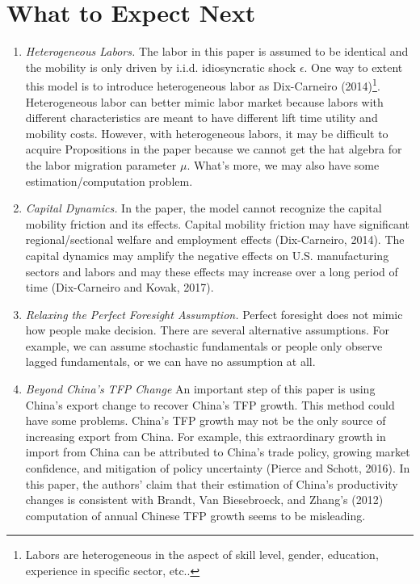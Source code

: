 \documentclass{article}
\begin{document}
\section{What to Expect Next}
\begin{enumerate}
    \item \textit{Heterogeneous Labors. } The labor in this paper is assumed to be identical and the mobility is only driven by i.i.d. idiosyncratic shock $\epsilon$. One way to extent this model is to introduce heterogeneous labor as Dix-Carneiro (2014)\footnote{Labors are heterogeneous in the aspect of skill level, gender, education, experience in specific sector, etc..}. Heterogeneous labor can better mimic labor market because labors with different characteristics are meant to have different lift time utility and mobility costs. However, with heterogeneous labors, it may be difficult to acquire Propositions in the paper because we cannot get the hat algebra for the labor migration parameter $\mu$. What's more, we may also have some estimation/computation problem.
    \item \textit{Capital Dynamics. } In the paper, the model cannot recognize the capital mobility friction and its effects. Capital mobility friction may have significant regional/sectional welfare and employment effects (Dix-Carneiro, 2014). The capital dynamics may amplify the negative effects on U.S. manufacturing sectors and labors and may these effects may increase over a long period of time (Dix-Carneiro and Kovak, 2017). 
    \item \textit{Relaxing the Perfect Foresight Assumption. } Perfect foresight does not mimic how people make decision. There are several alternative assumptions. For example, we can assume stochastic fundamentals or people only observe lagged fundamentals, or we can have no assumption at all. 
    \item \textit{Beyond China's TFP Change} An important step of this paper is using China's export change to recover China's TFP growth. This method could have some problems. China's TFP growth may not be the only source of increasing export from China. For example, this extraordinary growth in import from China can be attributed to China's trade policy, growing market confidence, and mitigation of policy uncertainty (Pierce and Schott, 2016). In this paper, the authors' claim that their estimation of China's productivity changes is consistent with Brandt, Van Biesebroeck, and Zhang's (2012) computation of annual Chinese TFP growth seems to be misleading. 
    
\end{enumerate}
\end{document}
